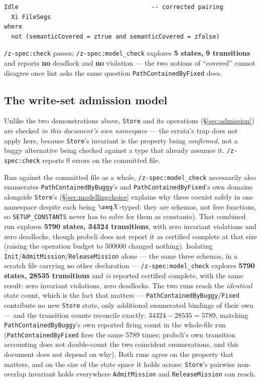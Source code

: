 \documentclass[a4paper,10pt,fleqn]{article}
\newcommand{\field}[1]{\texttt{#1}}
\begin{document}
\begin{verbatim}
Idle                                     -- corrected pairing
  Xi FileSegs
where
  not (semanticCovered = ztrue and semanticCovered = zfalse)
\end{verbatim}

\texttt{/z-spec:check} passes; \texttt{/z-spec:model\_check} explores
\textbf{5 states, 9 transitions} and reports \textbf{no} deadlock and
\textbf{no} violation --- the two notions of ``covered'' cannot
disagree once lint asks the same question \field{PathContainedByFixed}
does.

\subsection{The write-set admission model}
\label{sec:validation-admission}

Unlike the two demonstrations above, \field{Store} and its operations
(\S\ref{sec:admission}) are checked \emph{in this document's own
namespace} --- the errata's trap does not apply here, because
\field{Store}'s invariant is the property being \emph{confirmed}, not
a buggy alternative being checked against a type that already
assumes it. \texttt{/z-spec:check} reports 0 errors on the committed
file.

Run against the committed file as a whole, \texttt{/z-spec:model\_check}
necessarily also enumerates \field{PathContainedByBuggy}'s and
\field{PathContainedByFixed}'s own domains alongside \field{Store}'s
(\S\ref{sec:modellingchoice} explains why these coexist safely in one
namespace despite each being $\seq X$-typed: they are schemas, not
free functions, so \texttt{SETUP\_CONSTANTS} never has to solve for
them as constants). That combined run explores \textbf{5790 states,
34324 transitions}, with zero invariant violations and zero deadlocks,
though probcli does not report it as certified complete at that size
(raising the operation budget to 500000 changed nothing). Isolating
\field{Init}/\field{AdmitMission}/\field{ReleaseMission} alone ---
the same three schemas, in a scratch file carrying no other
declaration --- \texttt{/z-spec:model\_check} explores \textbf{5790
states, 28535 transitions} and \emph{is} reported certified complete,
with the same result: zero invariant violations, zero deadlocks. The
two runs reach the \emph{identical} state count, which is the fact
that matters --- \field{PathContainedByBuggy}/\field{Fixed} contribute
no new \field{Store} state, only additional enumerated bindings of
their own --- and the transition counts reconcile exactly:
$34324 - 28535 = 5789$, matching \field{PathContainedByBuggy}'s own
reported firing count in the whole-file run (\field{PathContainedByFixed}
fires the same 5789 times; probcli's own transition accounting does
not double-count the two coincident enumerations, and this document
does not depend on why). Both runs agree on the property that
matters, and on the size of the state space it holds across:
\field{Store}'s pairwise non-overlap invariant holds everywhere
\field{AdmitMission} and
\field{ReleaseMission} can reach.
\end{document}
